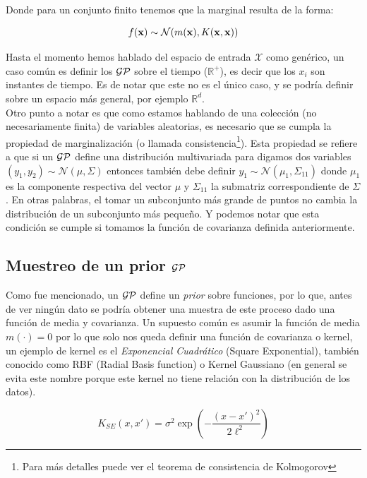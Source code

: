Donde para un conjunto finito tenemos que la marginal resulta de la forma:

\begin{equation}
	f(\mathbf{x}) \sim \mathcal{N}(m(\mathbf{x}), K(\mathbf{x}, \mathbf{x}))
\end{equation}

Hasta el momento hemos hablado del espacio de entrada $\mathcal{X}$ como genérico, un caso común es definir los $\mathcal{GP}$ sobre el tiempo ($\mathbb{R}^{+}$), es decir que los $x_i$ son instantes de tiempo. Es de notar que este no es el único caso, y se podría definir sobre un espacio más general, por ejemplo $\mathbb{R}^d$.\\

Otro punto a notar es que como estamos hablando de una colección (no necesariamente finita) de variables aleatorias, es necesario que se cumpla la propiedad de marginalización (o llamada consistencia\footnote{Para más detalles puede ver el teorema de consistencia de Kolmogorov}). Esta propiedad se refiere a que si un $\mathcal{GP}$ define una distribución multivariada para digamos dos variables $(y_1, y_2) \sim \mathcal{N}(\mu, \Sigma)$ entonces también debe definir $y_1 \sim \mathcal{N}(\mu_1, \Sigma_{11})$ donde $\mu_1$ es la componente respectiva del vector $\mu$ y $\Sigma_{11}$ la submatriz correspondiente de $\Sigma$. En otras palabras, el tomar un subconjunto más grande de puntos no cambia la distribución de un subconjunto más pequeño. Y podemos notar que esta condición se cumple si tomamos la función de covarianza definida anteriormente.\\



\subsection{Muestreo de un prior $\mathcal{GP}$}

Como fue mencionado, un $\mathcal{GP}$ define un \textit{prior} sobre funciones, por lo que, antes de ver ningún dato se podría obtener una muestra de este proceso dado una función de media y covarianza. Un supuesto común es asumir la función de media $m(\cdot)=0$ por lo que solo nos queda definir una función de covarianza o kernel, un ejemplo de kernel es el \textit{Exponencial Cuadrático} (Square Exponential), también conocido como RBF (Radial Basis function) o Kernel Gaussiano (en general se evita este nombre porque este kernel no tiene relación con la distribución de los datos).

\begin{equation}
	K_{SE}(x, x') = \sigma^2 \exp\left( - \frac{\left( x- x'\right)^2}{2\ell^2} \right)
\end{equation}

